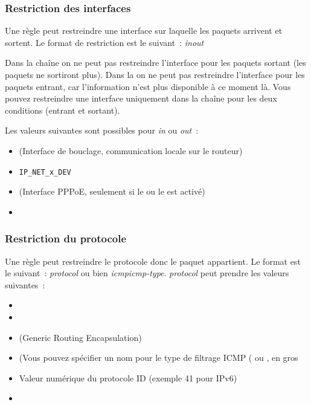 \subsubsection{Restriction des interfaces}

Une règle peut restreindre une interface sur laquelle les paquets arrivent et
sortent. Le format de restriction est le suivant~:
\emph{in}\fwmatch{:}\emph{out}

Dans la chaîne  on ne peut pas restreindre l'interface pour les
paquets sortant (les paquets ne sortiront plus). Dans la 
on ne peut pas restreindre l'interface pour les paquets entrant, car l'information
n'est plus disponible à ce moment là. Vous pouvez restreindre une interface
uniquement dans la chaîne  pour les deux conditions (entrant
et sortant).

Les valeurs suivantes sont possibles pour \emph{in} ou \emph{out}~:

\begin{itemize}
  \item {} (Interface de bouclage, communication locale sur le routeur)
  \item \verb+IP_NET_x_DEV+ 
  \item {} (Interface PPPoE, seulement si le  ou le
     est activé)
  \item {}
\end{itemize}

\subsubsection{Restriction du protocole}

Une règle peut restreindre le protocole donc le paquet appartient. Le format
est le suivant~:
\emph{protocol} ou bien \emph{icmp}\fwmatch{:}\emph{icmp-type}.
\emph{protocol} peut prendre les valeurs suivantes~:

\begin{itemize}
  \item {}
  \item {}
  \item {} (Generic Routing Encapsulation)
  \item {} (Vous pouvez spécifier un nom pour le type de filtrage
    ICMP ( ou , en gros
  \item Valeur numérique du protocole ID (exemple 41 pour IPv6)
  \item {}
\end{itemize}

